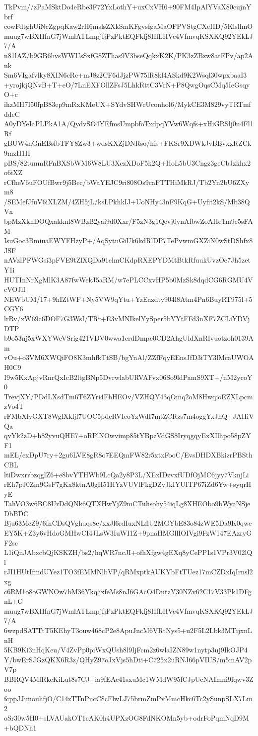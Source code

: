 TkPvm//zPaMSktDo4eRbe3F72YxLothY+uxCxVH6+90FM4IpAlYVaX80cujnYbrf
cowFdtghUiNcZgpqKaw2rH6mslsZXkSmKFgvsfgaMaOFPVStgCXeIID/5KlslhnO
muug7wBXHfnG7jWmlATLmpjfjPzPktEQFkfj8HfLHVc4VfmvqKSXKQ92YEkLJ7/A
n81lAZ/b9GB6hvsWWUsSxfG8ZThas9V3bseQqkxK2K/PK3zZBzw8atFPv/ap2Ank
Sm6VIgafvlky8XIN6cRc+mJ8z2CF6dJjzPW75lR8kl4ASkd9K2Wsql30wpxbaaI3
+yrojkjQNvB+T+eO/7LnEXFOllZFsJ5LhkRttC3VrN+P8QwgOqsCMq5IeGsqyO+c
ihzMH7I50fpB83ep9mRxKMeUX+SYdvSHWcUconhol6/MykCE3M829vyTRTmfddcC
A0yDYeIaPLPkA1A/QydvSO4YEfmsUmpbfoTxdpqYVw6Wqfs+xHiGRSlj0u4Fl1Rf
gBUW4nGnEBsfbTFY8Zw3+wdsKXZjDNRso/his+FKSr9XDWkJvBBvxxRZCk9mzH1H
pBS/82tunmRFnBXSbWM6W8LU3XczXDoF5k2Q+HoL5bU3Cngz3geCbJzkhx2o6iXZ
rCfheV6uFOUfBwr9j5Bec/bWaYEJC9ri808Os9caFTTHiMkRJ/Tb2Yn2bU6ZXym8
/SEMefJfuV6iXLZM/4ZH5jL/ksLPkhkIJ+UoNHy43nF9KqG+Uyfit2kS/Mb38QVx
bpMzXknDOQxakknl8WBzB2yai9d0Xxr/F5zN3g1Qevj0ynAfbwZoAHq1m9e5sFAM
IsuGoc3BmiuaEWYFHzyP+/AqSytnGiUk6kdRlDP7TePvwmGXZiN0wStDShfx8JSF
nAVzlPFWGsi3pFVE9tZlXQDa91clmCKdpRXEPYDMtBtkRfuukUvzOe7Jh5zetY1i
HUTInNrXgMlK3A87fwWekJ5aRM/w7ePLCCxvHP5b0MzSk8dqdCG6RGMU4VcVOJlI
NEWbUM/17+9hIZtWF+Ny5VW9qYtu+YzEazdty904l8Atm4Pn6BuyRT975l+5CGY6
lrRv/xW69c6DOF7G3WsI/TRr+E3vMNIkelYySper5bYYtFFd3nXF7ZCLiYDVjDTP
b9o53nj5xWXYWeVSrig421VDV0wwa1crdDmpc0CD2AhgUldXnRIvuotzoh0139Am
vOu+o3VM6XWQiFO8K3mhfkTtSB/bgYnAl/ZZfFqyEEnsJfD3iTY3lMcaUWOAH0C9
I9w5KxApjvRnrQxIcB2ltgBNp5DvrwlabURVAFvx06So9ldPamS9XT+/nM2ycoY0
TrevjXY/PDdLXsdTm6T6ZYri4FhHEOv/VZHQY43qOmq2oM8HwqioEZXLpcmzVo4T
rFMbXlyGXT8WglXkljl7UOC5pdcRVIeoYzWdI7mtZCRzs7m4oggYxJhQ+JAHiVQa
qvYk2zD+h82yvuQHE7+oRPlNOwvimp85tYBpzVdGS8IryqgqyExXIlhpo58pZYF1
mEL/exDpU7ry+2gu6LVE8gR8o7EEQmFW82r5xtxFooC/EvsDHDXBkizrPBSthCBL
ltiDwxrrbzqglZ6+e8bvYTHWb9LcQa2y8P3L/XExIDzvxfUDfOjMC6jyy7VknjLi
rEh7pJ0Zm9GsF7gKx8ktnA0gH51HYzVUVlFkgDZyJkIYUITP67iZd6Yw+syqrHyE
TahVO3w6BC8UrDdQNk6QTXHwYjZ9mCTuhsohy54iqLg8XHEObo9bWyaNSjeDbBDC
Bju63McZ9/6fnCDsQVghuqs8e/xxJl6rdIuxNLflU2MGYbE83o84zWE5Da9K0qwe
EY5K+Z3y6vHdoGMHwCI4JLsW3IuWI1Z+9pnaHMGllIOIVgi9FzW147EAzryGF2sc
L1iQnJAbxcbQjKSKZH/bs2/hqWR7ncJI+ofhXfgw4gEXq8yCePP1s1VPr3V02lQl
rJI1HUtIfmdUYez1TO3fEMMNlbVP/qRMxptkAUKYbFtTUez17mCZDxIqIrnsl2xg
c6RM1o8oGWNOw7bM36Ykq7xfeMs8nJ6GAcO4DutzY30NZv62C17V33Pk1DFgnL+G
muug7wBXHfnG7jWmlATLmpjfjPzPktEQFkfj8HfLHVc4VfmvqKSXKQ92YEkLJ7/A
6wzpdSATTtT5KEhyT3ouw468cP2e8ApuJncM6VRtNys5+u2F5L2Lbk3MTijxnLnH
5KB9Ki3nHqKeu/V4ZvPp0piWxQUsh8l9IjFcm2z6wlaIZN89w1nytp3uj9IkOJP4
Y/bwErSJGzQKX6R3z/QHyZ97oJxVjs5hDti+C725x2uRNJ66pVIUS/m5mAV2pV7p
BBRQV4MfRkeKiLut8s7CJ+ia9fEAc41sxuMc1WMdW95fCJpUcNAImni9fqwv3Zoo
fcppJJimouhfjO/C14zTTnPucC8cFlwLJ75brmZmPvMmcHkc6Tc2ySunpSLX7Lm2
oSr30w5H0+sLVAUakOT1cAK0h4UPXzOG8FdNKOMn5yb+odrFoPqmNqD9M+bQDNh1
